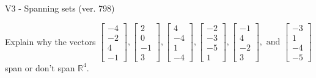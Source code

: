 \begin{exercise}
  \begin{exerciseTitle}V3 - Spanning sets (ver. 798)\end{exerciseTitle}
  \begin{exerciseStatement}
    Explain why the vectors \(\left[\begin{array}{r}
-4 \\
-2 \\
4 \\
-1
\end{array}\right] , \left[\begin{array}{r}
2 \\
0 \\
-1 \\
3
\end{array}\right] , \left[\begin{array}{r}
4 \\
-4 \\
1 \\
-4
\end{array}\right] , \left[\begin{array}{r}
-2 \\
-3 \\
-5 \\
1
\end{array}\right] , \left[\begin{array}{r}
-1 \\
4 \\
-2 \\
3
\end{array}\right] , \text{ and } \left[\begin{array}{r}
-3 \\
1 \\
-4 \\
-5
\end{array}\right]\) span or don't span \(\mathbb{R}^4\). 
	



\end{exerciseStatement}
\end{exercise}
